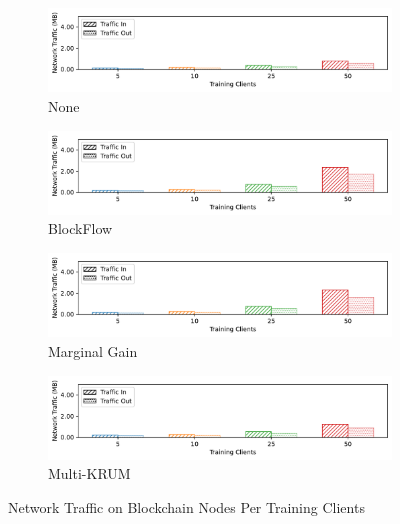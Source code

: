 \begin{figure}[!hp]
    \centering
    \begin{subfigure}[b]{0.49\textwidth}
        \centering
        \includegraphics[width=\textwidth]{graphics/clients/net_none_miner.pdf}
        \caption{None}
    \end{subfigure}
    \hfill
    \begin{subfigure}[b]{0.49\textwidth}
        \centering
        \includegraphics[width=\textwidth]{graphics/clients/net_blockflow_miner.pdf}
        \caption{BlockFlow}
    \end{subfigure}
    \hfill
    \begin{subfigure}[b]{0.49\textwidth}
        \centering
        \includegraphics[width=\textwidth]{graphics/clients/net_marginalgain_miner.pdf}
        \caption{Marginal Gain}
    \end{subfigure}
    \hfill
    \begin{subfigure}[b]{0.49\textwidth}
        \centering
        \includegraphics[width=\textwidth]{graphics/clients/net_multikrum_miner.pdf}
        \caption{Multi-KRUM}
    \end{subfigure}
    \caption{Network Traffic on Blockchain Nodes Per Training Clients}
    \label{fig:net_clients_degree_miner}
\end{figure}

